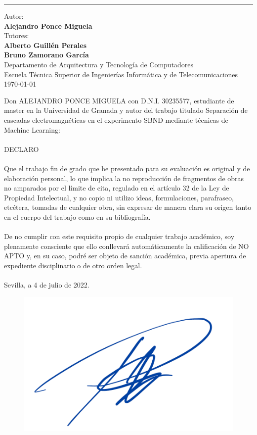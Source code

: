 \documentclass[a4paper,12pt,oneside,titlepage]{book}
\begin{document}
\begin{titlepage}
\begin{center}
      \rule{16cm}{0.3mm}
      \large
      Autor: \\
      \textbf{Alejandro Ponce Miguela} \\
      \vspace{0.3cm}
      Tutores: \\
      \textbf{Alberto Guillén Perales} \\
      \textbf{Bruno Zamorano García} \\
      \vspace{0.3cm}
      Departamento de Arquitectura y Tecnología de Computadores \\
      \vspace{0.3cm}
      Escuela Técnica Superior de Ingenierías Informática y de Telecomunicaciones\\
      \today
  \end{center}
\end{titlepage}
\frontmatter
\newpage
\noindent
Don ALEJANDRO PONCE MIGUELA con D.N.I. 30235577, estudiante de master en la Universidad de Granada y autor del trabajo titulado Separación de cascadas electromagnéticas en el experimento SBND mediante técnicas de Machine Learning:
\\
\\
DECLARO
\\
\\
Que el trabajo fin de grado que he presentado para su evaluación es original y de elaboración personal, lo
que implica la no reproducción de fragmentos de obras no amparados por el límite de cita, regulado en el
artículo 32 de la Ley de Propiedad Intelectual, y no copio ni utilizo ideas, formulaciones, parafraseo,
etcétera, tomadas de cualquier obra, sin expresar de manera clara su origen tanto en el cuerpo del trabajo
como en su bibliografía.
\\
\\
De no cumplir con este requisito propio de cualquier trabajo académico, soy plenamente consciente que
ello conllevará automáticamente la calificación de NO APTO y, en su caso, podré ser objeto de sanción
académica, previa apertura de expediente disciplinario o de otro orden legal.
\\
\\
Sevilla, a 4 de julio de 2022.
\begin{figure}[h!]
  \includegraphics[scale=0.18]{Captura.PNG}
\end{figure}
\end{document}
